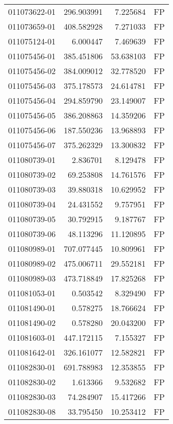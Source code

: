 \begin{tabular}{lrrl}
011073622-01 &  296.903991 &       7.225684 &   FP \\
011073659-01 &  408.582928 &       7.271033 &   FP \\
011075124-01 &    6.000447 &       7.469639 &   FP \\
011075456-01 &  385.451806 &      53.638103 &   FP \\
011075456-02 &  384.009012 &      32.778520 &   FP \\
011075456-03 &  375.178573 &      24.614781 &   FP \\
011075456-04 &  294.859790 &      23.149007 &   FP \\
011075456-05 &  386.208863 &      14.359206 &   FP \\
011075456-06 &  187.550236 &      13.968893 &   FP \\
011075456-07 &  375.262329 &      13.300832 &   FP \\
011080739-01 &    2.836701 &       8.129478 &   FP \\
011080739-02 &   69.253808 &      14.761576 &   FP \\
011080739-03 &   39.880318 &      10.629952 &   FP \\
011080739-04 &   24.431552 &       9.757951 &   FP \\
011080739-05 &   30.792915 &       9.187767 &   FP \\
011080739-06 &   48.113296 &      11.120895 &   FP \\
011080989-01 &  707.077445 &      10.809961 &   FP \\
011080989-02 &  475.006711 &      29.552181 &   FP \\
011080989-03 &  473.718849 &      17.825268 &   FP \\
011081053-01 &    0.503542 &       8.329490 &   FP \\
011081490-01 &    0.578275 &      18.766624 &   FP \\
011081490-02 &    0.578280 &      20.043200 &   FP \\
011081603-01 &  447.172115 &       7.155327 &   FP \\
011081642-01 &  326.161077 &      12.582821 &   FP \\
011082830-01 &  691.788983 &      12.353855 &   FP \\
011082830-02 &    1.613366 &       9.532682 &   FP \\
011082830-03 &   74.284907 &      15.417266 &   FP \\
011082830-08 &   33.795450 &      10.253412 &   FP \\

\end{tabular}

